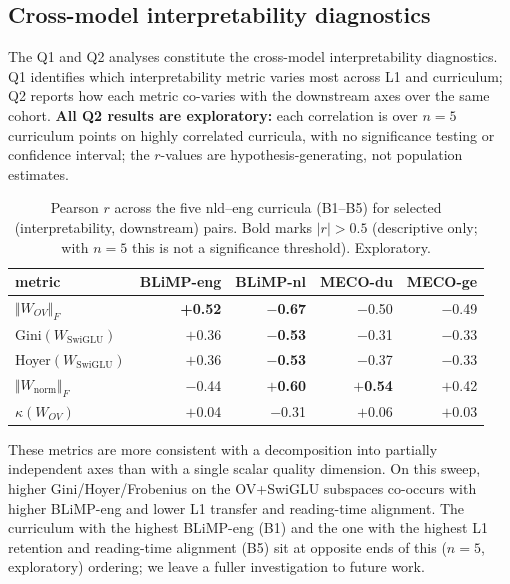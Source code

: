 \subsection{Cross-model interpretability diagnostics}\label{sec:pico-cross-comp}
 
The Q1 and Q2 analyses constitute the cross-model interpretability diagnostics. Q1 identifies which interpretability metric varies most across L1 and curriculum; Q2 reports how each metric co-varies with the downstream axes over the same cohort. \textbf{All Q2 results are exploratory:} each correlation is over $n=5$ curriculum points on highly correlated curricula, with no significance testing or confidence interval; the $r$-values are hypothesis-generating, not population estimates.
 
\begin{table}[h]
  \centering \small
  \caption{Pearson $r$ across the five nld--eng curricula (B1--B5) for selected (interpretability, downstream) pairs. Bold marks $|r|>0.5$ (descriptive only; with $n{=}5$ this is not a significance threshold). Exploratory.}
  \label{tab:pico-q2-headline}
  \begin{tabular}{lrrrr}
    \toprule
    metric & BLiMP-eng & BLiMP-nl & MECO-du & MECO-ge \\
    \midrule
    $\Vert W_{OV}\Vert_F$       & \textbf{+0.52} & \textbf{$-$0.67} & $-$0.50 & $-$0.49 \\
    Gini$(W_{\text{SwiGLU}})$   & $+$0.36        & \textbf{$-$0.53} & $-$0.31 & $-$0.33 \\
    Hoyer$(W_{\text{SwiGLU}})$  & $+$0.36        & \textbf{$-$0.53} & $-$0.37 & $-$0.33 \\
    $\Vert W_{\text{norm}}\Vert_F$ & $-$0.44     & \textbf{$+$0.60} & \textbf{$+$0.54} & $+$0.42 \\
    $\kappa(W_{OV})$            & $+$0.04        & $-$0.31          & $+$0.06 & $+$0.03 \\
    \bottomrule
  \end{tabular}
\end{table}
 
These metrics are more consistent with a decomposition into partially independent axes than with a single scalar quality dimension. On this sweep, higher Gini/Hoyer/Frobenius on the OV+SwiGLU subspaces co-occurs with higher BLiMP-eng and lower L1 transfer and reading-time alignment. The curriculum with the highest BLiMP-eng (B1) and the one with the highest L1 retention and reading-time alignment (B5) sit at opposite ends of this ($n{=}5$, exploratory) ordering; we leave a fuller investigation to future work.
 
